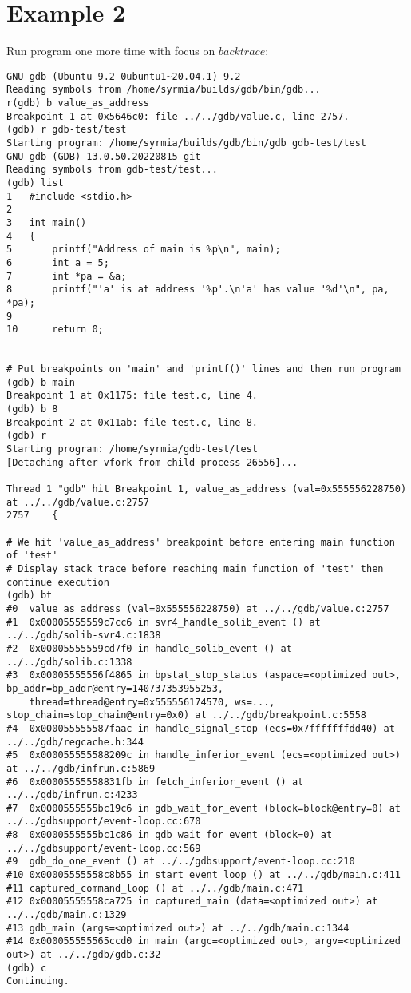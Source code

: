 \documentclass{report}
\begin{document}
\section *{Example 2}
Run program one more time with focus on $backtrace$:
\begin{verbatim}
GNU gdb (Ubuntu 9.2-0ubuntu1~20.04.1) 9.2
Reading symbols from /home/syrmia/builds/gdb/bin/gdb...
r(gdb) b value_as_address
Breakpoint 1 at 0x5646c0: file ../../gdb/value.c, line 2757.
(gdb) r gdb-test/test
Starting program: /home/syrmia/builds/gdb/bin/gdb gdb-test/test
GNU gdb (GDB) 13.0.50.20220815-git
Reading symbols from gdb-test/test...
(gdb) list
1	#include <stdio.h>
2	
3	int main()
4	{
5		printf("Address of main is %p\n", main);
6		int a = 5;
7		int *pa = &a;
8		printf("'a' is at address '%p'.\n'a' has value '%d'\n", pa, *pa);
9	
10		return 0;


# Put breakpoints on 'main' and 'printf()' lines and then run program
(gdb) b main
Breakpoint 1 at 0x1175: file test.c, line 4.
(gdb) b 8
Breakpoint 2 at 0x11ab: file test.c, line 8.
(gdb) r
Starting program: /home/syrmia/gdb-test/test 
[Detaching after vfork from child process 26556]...

Thread 1 "gdb" hit Breakpoint 1, value_as_address (val=0x555556228750) at ../../gdb/value.c:2757
2757	{

# We hit 'value_as_address' breakpoint before entering main function of 'test'
# Display stack trace before reaching main function of 'test' then continue execution
(gdb) bt
#0  value_as_address (val=0x555556228750) at ../../gdb/value.c:2757
#1  0x00005555559c7cc6 in svr4_handle_solib_event () at ../../gdb/solib-svr4.c:1838
#2  0x00005555559cd7f0 in handle_solib_event () at ../../gdb/solib.c:1338
#3  0x00005555556f4865 in bpstat_stop_status (aspace=<optimized out>, bp_addr=bp_addr@entry=140737353955253, 
    thread=thread@entry=0x555556174570, ws=..., stop_chain=stop_chain@entry=0x0) at ../../gdb/breakpoint.c:5558
#4  0x000055555587faac in handle_signal_stop (ecs=0x7fffffffdd40) at ../../gdb/regcache.h:344
#5  0x000055555588209c in handle_inferior_event (ecs=<optimized out>) at ../../gdb/infrun.c:5869
#6  0x00005555558831fb in fetch_inferior_event () at ../../gdb/infrun.c:4233
#7  0x0000555555bc19c6 in gdb_wait_for_event (block=block@entry=0) at ../../gdbsupport/event-loop.cc:670
#8  0x0000555555bc1c86 in gdb_wait_for_event (block=0) at ../../gdbsupport/event-loop.cc:569
#9  gdb_do_one_event () at ../../gdbsupport/event-loop.cc:210
#10 0x00005555558c8b55 in start_event_loop () at ../../gdb/main.c:411
#11 captured_command_loop () at ../../gdb/main.c:471
#12 0x00005555558ca725 in captured_main (data=<optimized out>) at ../../gdb/main.c:1329
#13 gdb_main (args=<optimized out>) at ../../gdb/main.c:1344
#14 0x000055555565ccd0 in main (argc=<optimized out>, argv=<optimized out>) at ../../gdb/gdb.c:32
(gdb) c
Continuing.


\end{verbatim}
\end{document}
